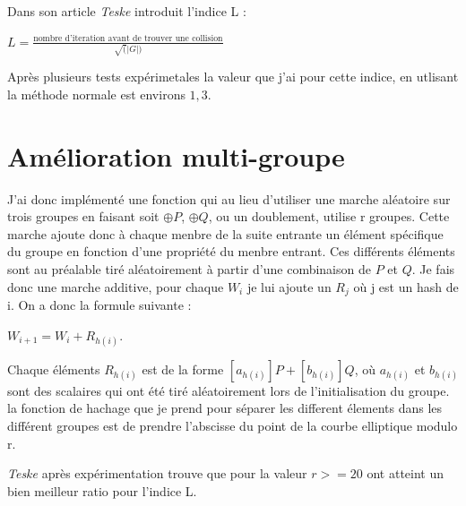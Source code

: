 \documentclass[a4paper,10pt]{report}
\begin{document}
Dans son article \textit{Teske} introduit l'indice L :
\begin{center}
 $ L = \frac{\text{nombre d'iteration avant de trouver une collision}}{\sqrt(|G|)} $
\end{center}

Après plusieurs tests expérimetales la valeur que j'ai pour cette indice, en utlisant la méthode normale est environs $1,3$.\\

\section{Amélioration multi-groupe}

J'ai donc implémenté une fonction qui au lieu d'utiliser une marche aléatoire sur trois groupes en faisant soit $\oplus P$, $\oplus Q$, ou un doublement,
utilise r groupes. Cette marche ajoute donc à chaque menbre de la suite entrante un élément spécifique du groupe en fonction d'une propriété du menbre entrant. Ces différents éléments sont au préalable tiré aléatoirement
à partir d'une combinaison de $P$ et $Q$. Je fais donc une marche additive, pour chaque $W_i$ je lui ajoute un $R_j$ où j est un hash de i. On a donc la formule suivante : 
\begin{center}
$ W_{i+1} = W_{i} + R_{h(i)} $.
\end{center}

Chaque éléments $R_{h(i)}$ est de la forme $ [a_{h(i)}]P + [b_{h(i)}]Q$, où $a_{h(i)}$ et $b_{h(i)}$ sont des scalaires qui ont été tiré aléatoirement lors de l'initialisation du groupe.\\

la fonction  de hachage que je prend pour séparer les different élements dans les différent groupes est de prendre l'abscisse du point de la courbe elliptique modulo r.

\textit{Teske} après expérimentation trouve que pour la valeur $r >= 20$ ont atteint un bien meilleur ratio pour l'indice L.
\end{document}
